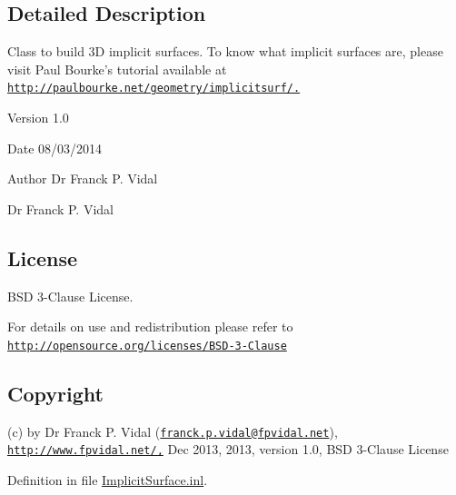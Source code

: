 \subsection{Detailed Description}
Class to build 3D implicit surfaces. To know what implicit surfaces are, please visit Paul Bourke's tutorial available at \href{http://paulbourke.net/geometry/implicitsurf/.}{\tt http://paulbourke.net/geometry/implicitsurf/.} \begin{DoxyVersion}{Version}
1.0
\end{DoxyVersion}
\begin{DoxyDate}{Date}
08/03/2014
\end{DoxyDate}
\begin{DoxyAuthor}{Author}
Dr Franck P. Vidal

Dr Franck P. Vidal
\end{DoxyAuthor}
\hypertarget{_x_ray_renderer_8inl_License}{}\subsection{License}\label{_x_ray_renderer_8inl_License}
BSD 3-\/Clause License.

For details on use and redistribution please refer to \href{http://opensource.org/licenses/BSD-3-Clause}{\tt http://opensource.org/licenses/BSD-\/3-\/Clause}\hypertarget{_x_ray_renderer_8inl_Copyright}{}\subsection{Copyright}\label{_x_ray_renderer_8inl_Copyright}
(c) by Dr Franck P. Vidal (\href{mailto:franck.p.vidal@fpvidal.net}{\tt franck.p.vidal@fpvidal.net}), \href{http://www.fpvidal.net/,}{\tt http://www.fpvidal.net/,} Dec 2013, 2013, version 1.0, BSD 3-\/Clause License 

Definition in file \hyperlink{_implicit_surface_8inl_source}{ImplicitSurface.inl}.

